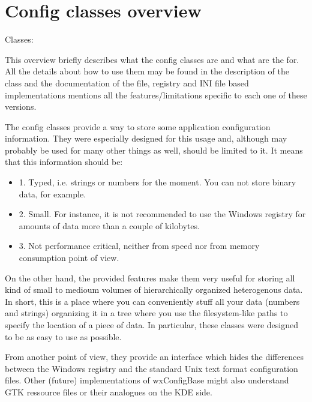 \section{Config classes overview}\label{wxconfigoverview}

Classes: 

This overview briefly describes what the config classes are and what are the
for. All the details about how to use them may be found in the description of
the  class and the documentation of the
file, registry and INI file based implementations mentions all the
features/limitations specific to each one of these versions.

The config classes provide a way to store some application configuration
information. They were especially designed for this usage and, although may
probably be used for many other things as well, should be limited to it. It
means that this information should be:
\begin{itemize}
\item{1.} Typed, i.e. strings or numbers for the moment. You can not store
binary data, for example.
\item{2.} Small. For instance, it is not recommended to use the Windows
registry for amounts of data more than a couple of kilobytes.
\item{3.} Not performance critical, neither from speed nor from memory
consumption point of view.
\end{itemize}

On the other hand, the provided features make them very useful for storing all
kind of small to medioum volumes of hierarchically organized heterogenous
data. In short, this is a place where you can conveniently stuff all your data
(numbers and strings) organizing it in a tree where you use the
filesystem-like paths to specify the location of a piece of data. In
particular, these classes were designed to be as easy to use as possible.

From another point of view, they provide an interface which hides the
differences between the Windows registry and the standard Unix text format
configuration files. Other (future) implementations of wxConfigBase might also
understand GTK ressource files or their analogues on the KDE side.


